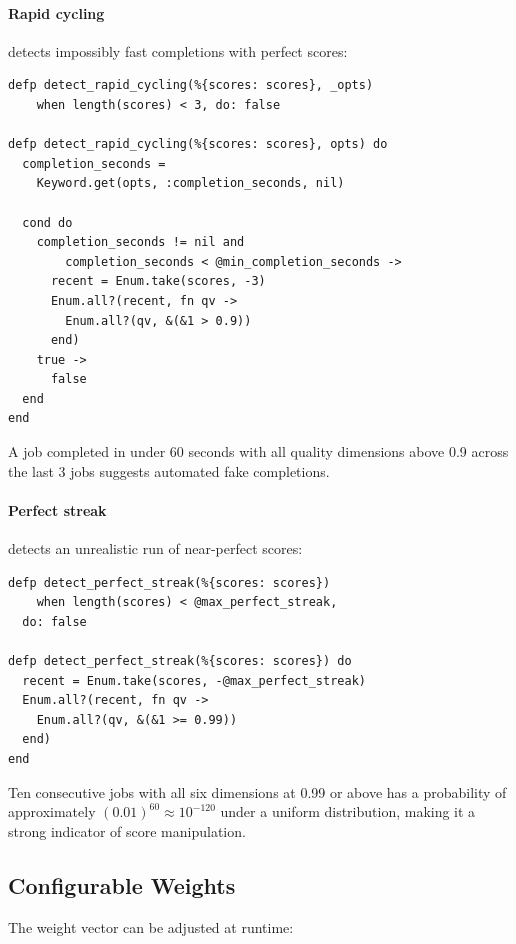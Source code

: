 \documentclass[12pt,a4paper]{article}
\theoremstyle{plain}
\theoremstyle{definition}
\begin{document}
\paragraph{Rapid cycling} detects impossibly fast completions with perfect scores:

\begin{lstlisting}[caption={Rapid cycling detection},label={lst:rep-rapid}]
defp detect_rapid_cycling(%{scores: scores}, _opts)
    when length(scores) < 3, do: false

defp detect_rapid_cycling(%{scores: scores}, opts) do
  completion_seconds =
    Keyword.get(opts, :completion_seconds, nil)

  cond do
    completion_seconds != nil and
        completion_seconds < @min_completion_seconds ->
      recent = Enum.take(scores, -3)
      Enum.all?(recent, fn qv ->
        Enum.all?(qv, &(&1 > 0.9))
      end)
    true ->
      false
  end
end
\end{lstlisting}

A job completed in under 60 seconds with all quality dimensions above 0.9 across the last 3 jobs suggests automated fake completions.

\paragraph{Perfect streak} detects an unrealistic run of near-perfect scores:

\begin{lstlisting}[caption={Perfect streak detection},label={lst:rep-streak}]
defp detect_perfect_streak(%{scores: scores})
    when length(scores) < @max_perfect_streak,
  do: false

defp detect_perfect_streak(%{scores: scores}) do
  recent = Enum.take(scores, -@max_perfect_streak)
  Enum.all?(recent, fn qv ->
    Enum.all?(qv, &(&1 >= 0.99))
  end)
end
\end{lstlisting}

Ten consecutive jobs with all six dimensions at 0.99 or above has a probability of approximately $(0.01)^{60} \approx 10^{-120}$ under a uniform distribution, making it a strong indicator of score manipulation.

\subsection{Configurable Weights}

The weight vector can be adjusted at runtime:
\end{document}
